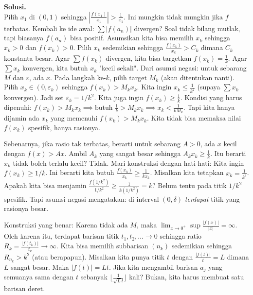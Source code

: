 \documentclass[12pt,twoside]{article}
\newenvironment{solution}
{
	\par\noindent\textbf{\underline{Solusi.}}\\
}
{
	\par
}
\begin{document}
\begin{enumerate}
\begin{solution}
          Pilih $x_1$ di $(0, 1)$ sehingga $|\frac{f(x_1)}{x_1}| > \frac{1}{x_1}$. Ini mungkin tidak mungkin jika $f$ terbatas.
          Kembali ke ide awal: $\sum |f(a_n)|$ divergen? Soal tidak bilang mutlak, tapi biasanya $f(a_n)$ bisa positif.
          Asumsikan kita bisa memilih $x_k$ sehingga $x_k > 0$ dan $f(x_k) > 0$.
          Pilih $x_k$ sedemikian sehingga $\frac{f(x_k)}{x_k} > C_k$ dimana $C_k$ konstanta besar.
          Agar $\sum f(x_k)$ divergen, kita bisa targetkan $f(x_k) = \frac{1}{k}$.
          Agar $\sum x_k$ konvergen, kita butuh $x_k$ "kecil sekali".
          Dari asumsi negasi: untuk sebarang $M$ dan $\varepsilon$, ada $x$.
          Pada langkah ke-$k$, pilih target $M_k$ (akan ditentukan nanti).
          Pilih $x_k \in (0, \varepsilon_k)$ sehingga $f(x_k) > M_k x_k$.
          Kita ingin $x_k \le \frac{1}{k^2}$ (supaya $\sum x_k$ konvergen). Jadi set $\varepsilon_k = 1/k^2$.
          Kita juga ingin $f(x_k) \ge \frac{1}{k}$.
          Kondisi yang harus dipenuhi: $f(x_k) > M_k x_k \implies \text{butuh } \frac{1}{k} > M_k x_k \implies x_k < \frac{1}{k M_k}$.
          Tapi kita hanya dijamin ada $x_k$ yang memenuhi $f(x_k) > M_k x_k$. Kita tidak bisa memaksa nilai $f(x_k)$ spesifik, hanya rasionya.

          Sebenarnya, jika rasio tak terbatas, berarti untuk sebarang $A > 0$, ada $x$ kecil dengan $f(x) > A x$.
          Ambil $A_k$ yang sangat besar sehingga $A_k x_k \ge \frac{1}{k}$.
          Itu berarti $x_k$ tidak boleh terlalu kecil? Tidak.
          Mari konstruksi dengan hati-hati:
          Kita ingin $f(x_k) \ge 1/k$.
          Ini berarti kita butuh $\frac{f(x_k)}{x_k} \ge \frac{1}{k x_k}$.
          Misalkan kita tetapkan $x_k = \frac{1}{k^2}$.
          Apakah kita bisa menjamin $\frac{f(1/k^2)}{1/k^2} \ge \frac{1}{k(1/k^2)} = k$?
          Belum tentu pada titik $1/k^2$ spesifik.
          Tapi asumsi negasi mengatakan: di interval $(0, \delta)$ \textit{terdapat} titik yang rasionya besar.

          Konstruksi yang benar:
          Karena tidak ada $M$, maka $\lim_{x\to 0^+} \sup \frac{|f(x)|}{|x|} = \infty$.
          Oleh karena itu, terdapat barisan titik $t_1, t_2, \dots \to 0$ sehingga ratio $R_k = \frac{|f(t_k)|}{t_k} \to \infty$.
          Kita bisa memilih subbarisan $(n_k)$ sedemikian sehingga $R_{n_k} > k^2$ (atau berapapun).
          Misalkan kita punya titik $t$ dengan $\frac{|f(t)|}{t} = L$ dimana $L$ sangat besar.
          Maka $|f(t)| = L t$.
          Jika kita mengambil barisan $a_j$ yang semuanya sama dengan $t$ sebanyak $\lfloor \frac{1}{\sqrt{L} t} \rfloor$ kali?
          Bukan, kita harus membuat satu barisan deret.


\end{solution}
\end{enumerate}
\end{document}
